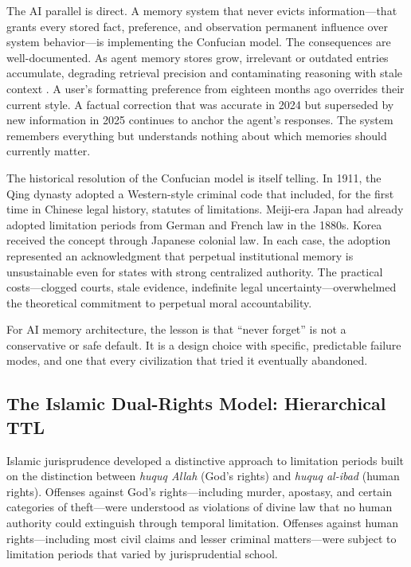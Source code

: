 \documentclass[12pt]{article}
\begin{document}
The AI parallel is direct. A memory system that never evicts information---that grants every stored fact, preference, and observation permanent influence over system behavior---is implementing the Confucian model. The consequences are well-documented. As agent memory stores grow, irrelevant or outdated entries accumulate, degrading retrieval precision and contaminating reasoning with stale context \citep{chroma2025}. A user's formatting preference from eighteen months ago overrides their current style. A factual correction that was accurate in 2024 but superseded by new information in 2025 continues to anchor the agent's responses. The system remembers everything but understands nothing about which memories should currently matter.

The historical resolution of the Confucian model is itself telling. In 1911, the Qing dynasty adopted a Western-style criminal code that included, for the first time in Chinese legal history, statutes of limitations. Meiji-era Japan had already adopted limitation periods from German and French law in the 1880s. Korea received the concept through Japanese colonial law. In each case, the adoption represented an acknowledgment that perpetual institutional memory is unsustainable even for states with strong centralized authority. The practical costs---clogged courts, stale evidence, indefinite legal uncertainty---overwhelmed the theoretical commitment to perpetual moral accountability.

For AI memory architecture, the lesson is that ``never forget'' is not a conservative or safe default. It is a design choice with specific, predictable failure modes, and one that every civilization that tried it eventually abandoned.

\subsection{The Islamic Dual-Rights Model: Hierarchical TTL}
\label{sec:islamic}

Islamic jurisprudence developed a distinctive approach to limitation periods built on the distinction between \emph{huquq Allah} (God's rights) and \emph{huquq al-ibad} (human rights). Offenses against God's rights---including murder, apostasy, and certain categories of theft---were understood as violations of divine law that no human authority could extinguish through temporal limitation. Offenses against human rights---including most civil claims and lesser criminal matters---were subject to limitation periods that varied by jurisprudential school.
\end{document}
